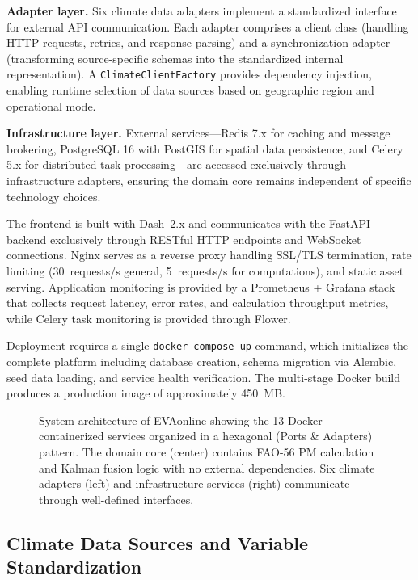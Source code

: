 \documentclass[preprint,review,12pt]{elsarticle}
\begin{document}
\textbf{Adapter layer.} Six climate data adapters implement a standardized
interface for external API communication. Each adapter comprises a client class
(handling HTTP requests, retries, and response parsing) and a synchronization
adapter (transforming source-specific schemas into the standardized internal
representation). A \texttt{ClimateClientFactory} provides dependency injection,
enabling runtime selection of data sources based on geographic region and
operational mode.

\textbf{Infrastructure layer.} External services---Redis 7.x for caching and
message brokering, PostgreSQL 16 with PostGIS for spatial data persistence,
and Celery 5.x for distributed task processing---are accessed exclusively
through infrastructure adapters, ensuring the domain core remains independent
of specific technology choices.

The frontend is built with Dash~2.x \citep{plotly} and communicates with the
FastAPI backend \citep{Ramirez2018} exclusively through RESTful HTTP endpoints
and WebSocket connections. Nginx serves as a reverse proxy handling SSL/TLS
termination, rate limiting (30~requests/s general, 5~requests/s for
computations), and static asset serving. Application monitoring is provided by
a Prometheus + Grafana stack that collects request latency, error rates, and
calculation throughput metrics, while Celery task monitoring is provided
through Flower.

Deployment requires a single \texttt{docker compose up} command, which
initializes the complete platform including database creation, schema migration
via Alembic, seed data loading, and service health verification. The
multi-stage Docker build produces a production image of approximately 450~MB.

\begin{figure}[htbp]
\centering
\caption{System architecture of EVAonline showing the 13 Docker-containerized
services organized in a hexagonal (Ports \& Adapters) pattern. The domain core
(center) contains FAO-56 PM calculation and Kalman fusion logic with no
external dependencies. Six climate adapters (left) and infrastructure services
(right) communicate through well-defined interfaces.}
\label{fig:architecture}
\end{figure}


\subsection{Climate Data Sources and Variable Standardization}
\label{subsec:data_sources}
\end{document}
